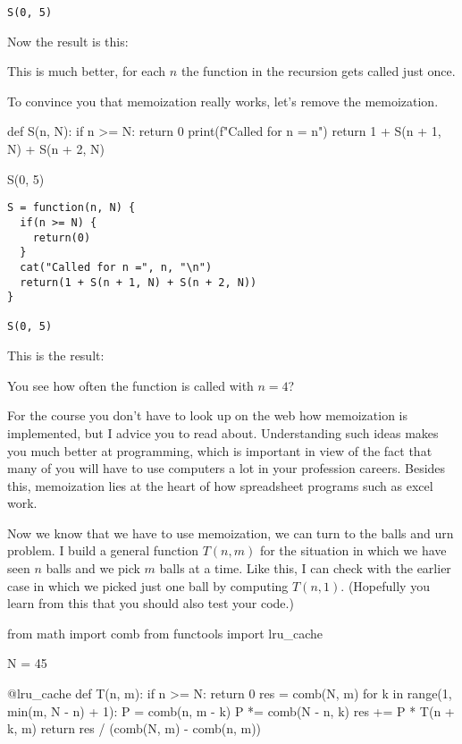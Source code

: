 \documentclass[lectures]{subfiles}
\begin{document}
\begin{exercise}
\begin{solution}
\begin{verbatim}
S(0, 5)
\end{verbatim}
Now the result is this:
\begin{center}
\printpythontex
\end{center}
This is much better, for each $n$ the function in the recursion gets called just once.

To convince you that memoization really works, let's remove the memoization.
\begin{pyblock}
def S(n, N):
    if n >= N:
        return 0
    print(f"Called for n = {n}\n")
    return 1 + S(n + 1, N) + S(n + 2, N)


S(0, 5)
\end{pyblock}
\begin{verbatim}
S = function(n, N) {
  if(n >= N) {
    return(0)
  }
  cat("Called for n =", n, "\n")
  return(1 + S(n + 1, N) + S(n + 2, N))
}

S(0, 5)
\end{verbatim}
This is the result:
\begin{center}
\printpythontex
\end{center}
You see how often the function is called with $n=4$?



For the course you don't have to look up on the web how memoization is implemented, but I advice you to read about.
Understanding such ideas makes you much better at programming, which is important in view of the fact that many of you will have to use computers a lot in your profession careers.
Besides this, memoization lies at the heart of how spreadsheet programs such as excel work.

Now we know that we have to use memoization, we can turn to the balls and urn problem.
I build a general function $T(n,m)$ for the situation in which we have seen $n$ balls and we pick $m$ balls at a time.
Like this, I can check with the earlier case in which we picked just one ball by computing $T(n, 1)$.
(Hopefully you learn from this that you should also test your code.)


\begin{pyblock}
from math import comb
from functools import lru_cache

N = 45


@lru_cache
def T(n, m):
    if n >= N:
        return 0
    res = comb(N, m)
    for k in range(1, min(m, N - n) + 1):
        P = comb(n, m - k)
        P *= comb(N - n, k)
        res += P * T(n + k, m)
    return res / (comb(N, m) - comb(n, m))


\end{pyblock}
\end{solution}
\end{exercise}
\end{document}
